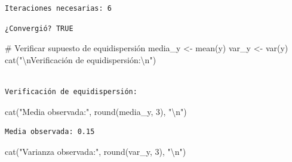 \documentclass[
  letterpaper,
  DIV=11,
  numbers=noendperiod]{scrreprt}
\newenvironment{Shaded}{\begin{snugshade}}{\end{snugshade}}
\newcommand{\CommentTok}[1]{\textcolor[rgb]{0.37,0.37,0.37}{#1}}
\newcommand{\DecValTok}[1]{\textcolor[rgb]{0.68,0.00,0.00}{#1}}
\newcommand{\FunctionTok}[1]{\textcolor[rgb]{0.28,0.35,0.67}{#1}}
\newcommand{\NormalTok}[1]{\textcolor[rgb]{0.00,0.23,0.31}{#1}}
\newcommand{\OtherTok}[1]{\textcolor[rgb]{0.00,0.23,0.31}{#1}}
\newcommand{\SpecialCharTok}[1]{\textcolor[rgb]{0.37,0.37,0.37}{#1}}
\newcommand{\StringTok}[1]{\textcolor[rgb]{0.13,0.47,0.30}{#1}}
\begin{document}
\begin{tcolorbox}
\begin{verbatim}
Iteraciones necesarias: 6 
\end{verbatim}

\begin{Shaded}
\end{Shaded}

\begin{verbatim}
¿Convergió? TRUE 
\end{verbatim}

\begin{Shaded}
\begin{Highlighting}[]
\CommentTok{\# Verificar supuesto de equidispersión}
\NormalTok{media\_y }\OtherTok{\textless{}{-}} \FunctionTok{mean}\NormalTok{(y)}
\NormalTok{var\_y }\OtherTok{\textless{}{-}} \FunctionTok{var}\NormalTok{(y)}
\FunctionTok{cat}\NormalTok{(}\StringTok{"}\SpecialCharTok{\textbackslash{}n}\StringTok{Verificación de equidispersión:}\SpecialCharTok{\textbackslash{}n}\StringTok{"}\NormalTok{)}
\end{Highlighting}
\end{Shaded}

\begin{verbatim}

Verificación de equidispersión:
\end{verbatim}

\begin{Shaded}
\begin{Highlighting}[]
\FunctionTok{cat}\NormalTok{(}\StringTok{"Media observada:"}\NormalTok{, }\FunctionTok{round}\NormalTok{(media\_y, }\DecValTok{3}\NormalTok{), }\StringTok{"}\SpecialCharTok{\textbackslash{}n}\StringTok{"}\NormalTok{)}
\end{Highlighting}
\end{Shaded}

\begin{verbatim}
Media observada: 0.15 
\end{verbatim}

\begin{Shaded}
\begin{Highlighting}[]
\FunctionTok{cat}\NormalTok{(}\StringTok{"Varianza observada:"}\NormalTok{, }\FunctionTok{round}\NormalTok{(var\_y, }\DecValTok{3}\NormalTok{), }\StringTok{"}\SpecialCharTok{\textbackslash{}n}\StringTok{"}\NormalTok{)}
\end{Highlighting}
\end{Shaded}


\end{tcolorbox}
\end{document}
